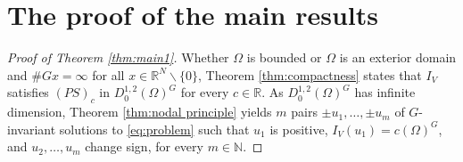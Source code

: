 \documentclass[10pt,letterpaper]{article}
\numberwithin{equation}{section}
\def\r{\mathbb{R}}
\def\rn{\mathbb{R}^N}
\def\n{\mathbb{N}}
\def\o{\Omega}
\begin{document}
\section{The proof of the main results}

\begin{proof}[Proof of Theorem \ref{thm:main1}]
Whether $\o$ is bounded or $\o$ is an exterior domain and $\#Gx=\infty$ for all $x\in\rn\smallsetminus\{0\}$, Theorem \ref{thm:compactness} states that $I_V$ satisfies $(PS)_c$ in $D^{1,2}_0(\o)^G$ for every $c\in\r$. As $D^{1,2}_0(\o)^G$ has infinite dimension, Theorem \ref{thm:nodal principle} yields $m$ pairs $\pm u_1,\ldots,\pm u_m$ of $G$-invariant solutions to \eqref{eq:problem} such that $u_1$ is positive, $I_V(u_1)=c(\o)^G$, and $u_2,\ldots,u_m$ change sign, for every $m\in\n$.
\end{proof}
\smallskip
\end{document}
